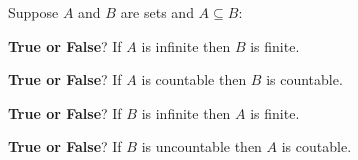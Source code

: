 
Suppose $A$ and $B$ are sets and $A \subseteq B$:

{\bf True or False}?  If $A$ is infinite then $B$ is finite.

\vfill

{\bf True or False}?  If $A$ is countable then $B$ is countable.

\vfill

{\bf True or False}?  If $B$ is infinite then $A$ is finite.

\vfill

{\bf True or False}?  If $B$ is uncountable then $A$ is coutable.

\vfill